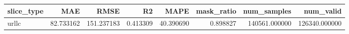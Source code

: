 \begin{tabular}{lrrrrrrr}
\toprule
slice_type & MAE & RMSE & R2 & MAPE & mask_ratio & num_samples & num_valid \\
\midrule
urllc & 82.733162 & 151.237183 & 0.413309 & 40.390690 & 0.898827 & 140561.000000 & 126340.000000 \\
\bottomrule
\end{tabular}
